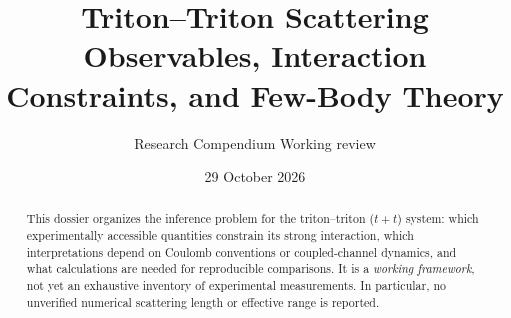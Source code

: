\documentclass[11pt]{article}
\title{\bfseries Triton--Triton Scattering\\[3pt]\large Observables, Interaction Constraints, and Few-Body Theory}
\author{Research Compendium \;\textbar\; Working review}
\date{29 October 2026}
\begin{document}
\maketitle
{}
\begin{abstract}
This dossier organizes the inference problem for the triton--triton ($t+t$) system: which experimentally accessible quantities constrain its strong interaction, which interpretations depend on Coulomb conventions or coupled-channel dynamics, and what calculations are needed for reproducible comparisons. It is a \emph{working framework}, not yet an exhaustive inventory of experimental measurements. In particular, no unverified numerical scattering length or effective range is reported.
\end{abstract}
\tableofcontents
\clearpage





\printbibliography[heading=bibintoc,title={References}]
\end{document}
